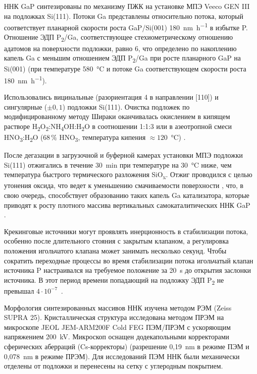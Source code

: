 ННК GaP синтезированы по механизму ПЖК на установке МПЭ Veeco GEN III на подложках Si(111). Потоки Ga представлены относительно потока, который соответствует планарной скорости роста GaP/Si(001) 180~\si{\nano\meter\per\hour} в избытке P. Отношение ЭДП P\textsubscript{2}/Ga, соответствующее стехиометрическому отношению адатомов на поверхности подложки, равно 6, что определено по накоплению капель Ga с меньшим отношением ЭДП P\textsubscript{2}/Ga при росте планарного GaP на Si(001) (при температуре 580~\si{\degreeCelsius} и потоке Ga соответствующем скорости роста 180~\si{\nano\meter\per\hour}).

Использовались вицинальные (разориентация 4{\textdegree} в направлении [110]) и сингулярные (\(\pm 0,1\){\textdegree}) подложки Si(111). Очистка подложек по модифицированному методу Шираки \cite{Okumura1997, Ishizaka2019} оканчивалась окислением в кипящем растворе H\textsubscript{2}O\textsubscript{2}:NH\textsubscript{4}OH:H\textsubscript{2}O в соотношении 1:1:3 или в азеотропной смеси HNO\textsubscript{3}:H\textsubscript{2}O (68\,\% HNO\textsubscript{3}, температура кипения \(\approx 120\)~\si{\degreeCelsius}) \cite{Imamura2010}.

После дегазации в загрузочной и буферной камерах установки МПЭ подложки Si(111) отжигались в течение 30~\si{\minute} при температуре на 30~\si{\degreeCelsius} ниже, чем температура быстрого термического разложения SiO\textsubscript{x}. Отжиг проводился с целью утонения оксида, что ведет к уменьшению смачиваемости поверхности \cite{Matteini2015}, что, в свою очередь, способствует образованию таких капель Ga катализатора, которые приводят к росту плотного массива вертикальных самокаталитических ННК GaP \cite{Dubrovskii2012a}.

Крекинговые источники могут проявлять инерционность в стабилизации потока, особенно после длительного стояния с закрытым клапаном, а регулировка положения игольчатого клапана может занимать несколько секунд. Чтобы сократить переходные процессы во время стабилизации потока игольчатый клапан источника P настраивался на требуемое положение за 20~\si{\second} до открытия заслонки источника. В этот период времени попадающий на подложку ЭДП P\textsubscript{2} не превышал \(4 \cdot 10^{-7}\)~\si{\torr}.

Морфология синтезированных массивов ННК изучена методом РЭМ (Zeiss SUPRA 25). Кристаллическая структура исследована методом ПРЭМ на микроскопе JEOL JEM-ARM200F Cold FEG ПЭМ/ПРЭМ с ускоряющим напряжением 200~\si{\kilo\volt}. Микроскоп оснащен додекапольными корректорами сферических аберраций (Cs-корректоры) (разрешение 0,19~\si{\nano\meter} в режиме ПЭМ и 0,078~\si{\nano\meter} в режиме ПРЭМ). Для исследований ПЭМ ННК были механически отделены от подложки и перенесены на сетку с углеродным покрытием.


